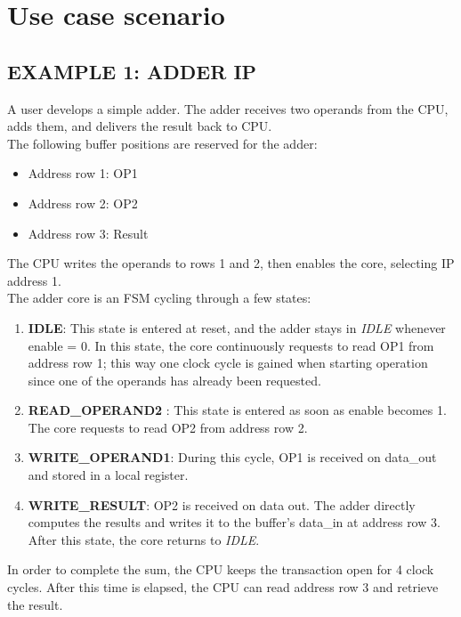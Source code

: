 \chapter{Use case scenario}\label{usecase}


\section{EXAMPLE 1: ADDER IP}

A user develops a simple adder. The adder receives two operands from the CPU, adds them, and delivers the result back to CPU. \\

The following buffer positions are reserved for the adder:
\begin{itemize}
\item Address row 1: OP1 
\item Address row 2: OP2
\item Address row 3: Result
\end{itemize}

The CPU writes the operands to rows 1 and 2, then enables the core, selecting IP address 1.\\

The adder core is an FSM cycling through a few states:
\begin{enumerate}
	\item \textbf{IDLE}: This state is entered at reset, and the adder stays in \textit{IDLE} whenever enable = 0. In this state, the core continuously requests to read OP1 from address row 1; this way one clock cycle is gained when starting operation since one of the operands has already been requested.

	\item \textbf{READ\_OPERAND2} : This state is entered as soon as enable becomes 1. The core requests to read OP2 from address row 2.

	\item\textbf{ WRITE\_OPERAND1}: During this cycle, OP1 is received on data\_out and stored in a local register.

	\item \textbf{WRITE\_RESULT}: OP2 is received on data out. The adder directly computes the results and writes it to the buffer's data\_in at address row 3. After this state, the core returns to \textit{IDLE}.
\end{enumerate}
In order to complete the sum, the CPU keeps the transaction open for 4 clock cycles. After this time is elapsed, the CPU can read address row 3 and retrieve the result. 

